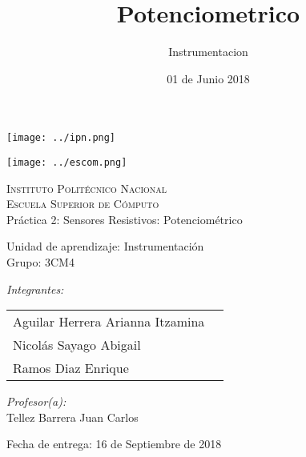 \documentclass[12pt]{article}
\date{ 01 de Junio 2018}
\title{Potenciometrico}
\author{Instrumentacion}
\begin{document}
		\begin{titlepage}
			\begin{center}
				
				
				\noindent
				\begin{minipage}{0.5\textwidth}
					\begin{flushleft} \large
						\texttt{[image: ../ipn.png]}
					\end{flushleft}
				\end{minipage}%
				\begin{minipage}{0.55\textwidth}
					\begin{flushright} \large
						\texttt{[image: ../escom.png]}
					\end{flushright}
				\end{minipage}
				
				\textsc{\LARGE Instituto Politécnico Nacional}\\[0.5cm]
				
				\textsc{\Large Escuela Superior de Cómputo}\\[1cm]
				
				
				{ \huge Práctica 2: Sensores Resistivos: Potenciométrico \\[1cm] }
				
				{ \Large Unidad de aprendizaje: Instrumentación} \\[1cm]
				
				{ \Large Grupo: 3CM4 } \\[1cm]
				
				\noindent
				\begin{minipage}{0.5\textwidth}
					\begin{flushleft} \large
						\emph{Integrantes:}\\
						
						\begin{tabular}{ll}
						Aguilar Herrera Arianna Itzamina \\
					    Nicolás Sayago Abigail\\
					    Ramos Diaz Enrique \\
					\end{tabular}
					\end{flushleft}
				\end{minipage}%
				\begin{minipage}{0.5\textwidth}
					\begin{flushright} \large
						\emph{Profesor(a):} \\
						Tellez Barrera Juan Carlos  \\
					\end{flushright}
				\end{minipage}
				
				\vfill
				
				{\large Fecha de entrega: 16 de Septiembre de 2018}
			\end{center}
		\end{titlepage}
	
\end{document}
